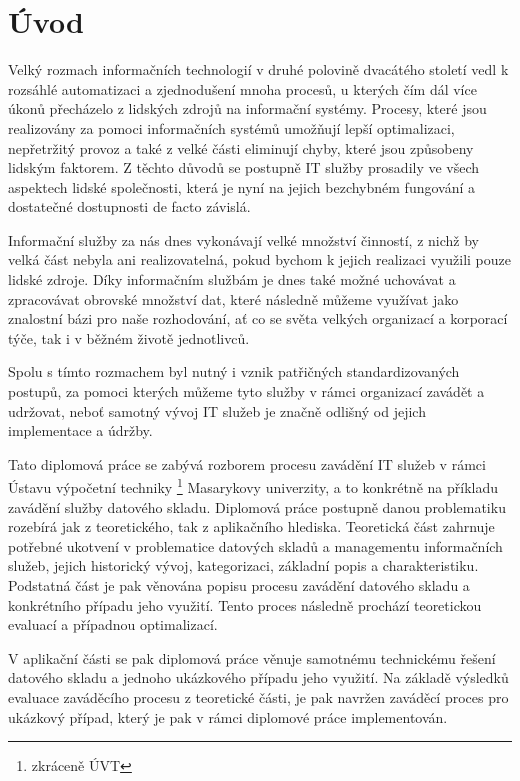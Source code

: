 \documentclass[
  digital,     %
  twoside,     %
  lof,         %
  lot,         %
]{fithesis4}
\begin{document}
\chapter{Úvod}
Velký rozmach informačních technologií v druhé polovině dvacátého století vedl k rozsáhlé automatizaci a zjednodušení mnoha procesů, u kterých čím dál více úkonů přecházelo z lidských zdrojů na informační systémy. Procesy, které jsou realizovány za pomoci informačních systémů umožňují lepší optimalizaci, nepřetržitý provoz a také z velké části eliminují chyby, které jsou způsobeny lidským faktorem. Z těchto důvodů se postupně IT služby prosadily ve všech aspektech lidské společnosti, která je nyní na jejich bezchybném fungování a dostatečné dostupnosti de facto závislá. 

Informační služby za nás dnes vykonávají velké množství činností, z nichž by velká část nebyla ani realizovatelná, pokud bychom k jejich realizaci využili pouze lidské zdroje. Díky informačním službám je dnes také možné uchovávat a zpracovávat obrovské množství dat, které následně můžeme využívat jako znalostní bázi pro naše rozhodování, ať co se světa velkých organizací a korporací týče, tak i v běžném životě jednotlivců.

Spolu s tímto rozmachem byl nutný i vznik patřičných standardizovaných postupů, za pomoci kterých můžeme tyto služby v rámci organizací zavádět a udržovat, neboť samotný vývoj IT služeb je značně odlišný od jejich implementace a údržby. 

Tato diplomová práce se zabývá rozborem procesu zavádění IT služeb v rámci Ústavu výpočetní techniky \footnote{zkráceně ÚVT} Masarykovy univerzity, a to konkrétně na příkladu zavádění služby datového skladu. Diplomová práce postupně danou problematiku rozebírá jak z teoretického, tak z aplikačního hlediska. Teoretická část zahrnuje potřebné ukotvení v problematice datových skladů a managementu informačních služeb, jejich historický vývoj, kategorizaci, základní popis a charakteristiku. Podstatná část je pak věnována popisu procesu zavádění datového skladu a konkrétního případu jeho využití. Tento proces následně prochází teoretickou evaluací a případnou optimalizací. 

V aplikační části se pak diplomová práce věnuje samotnému technickému řešení datového skladu a jednoho ukázkového případu jeho využití. Na základě výsledků evaluace zaváděcího procesu z teoretické části, je pak navržen zaváděcí proces pro ukázkový případ, který je pak v rámci diplomové práce implementován. 
\end{document}
